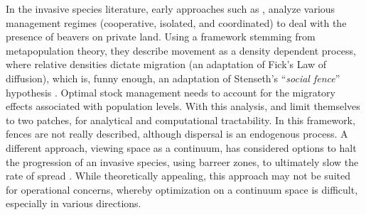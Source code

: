 In the invasive species literature, early approaches such as \cite{huffaker_optimal_1992}, \cite{bhat_controlling_1996} analyze various management regimes (cooperative, isolated, and coordinated) to deal with the presence of beavers on private land. Using a framework stemming from metapopulation theory, they describe movement as a density dependent process, where relative densities dictate migration (an adaptation of Fick's Law of diffusion), which is, funny enough, an adaptation of Stenseth's ``\textit{social fence}'' hypothesis \cite{stenseth_social_1988}. Optimal stock management needs to account for the migratory effects associated with population levels. With this analysis, \cite{huffaker_optimal_1992} and \cite{bhat_controlling_1996} limit themselves to two patches, for analytical and computational tractability. In this framework, fences are not really described, although dispersal is an endogenous process. A different approach, viewing space as a continuum, has considered options to halt the progression of an invasive species, using barreer zones, to ultimately slow the rate of spread \cite{sharov_bioeconomics_1998}. While theoretically appealing, this approach may not be suited for operational concerns, whereby optimization on a continuum space is difficult, especially in various directions. \\

